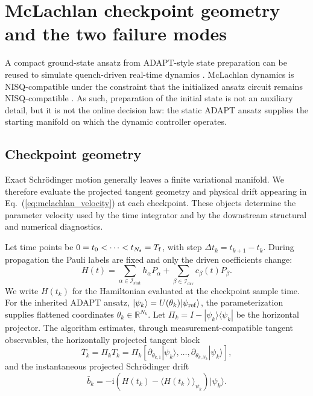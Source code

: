 \documentclass[
  reprint,
  amsmath,
  amssymb,
  aps,
  pra,
  nofootinbib,
  superscriptaddress,
  floatfix
]{revtex4-2}
\newcommand{\placeholder}[1]{\textcolor{red!70!black}{\ifmmode\left[#1\right]\else\textsf{[#1]}\fi}}
\newcommand{\ii}{\mathrm{i}}
\newcommand{\stat}{\mathrm{stat}}
\newcommand{\drv}{\mathrm{drv}}
\newcommand{\ket}[1]{|#1\rangle}
\newcommand{\bra}[1]{\langle #1|}
\newcommand{\expval}[1]{\langle #1\rangle}
\begin{document}
\section{McLachlan checkpoint geometry and the two failure modes}
\label{sec:dynamics_method}


A compact ground-state ansatz from ADAPT-style state preparation can be reused to simulate quench-driven real-time dynamics \cite{Grimsley2019,Tang2021,Yordanov2021}. McLachlan dynamics is NISQ-compatible under the constraint that the initialized ansatz circuit remains NISQ-compatible \cite{McLachlan1964,LiBenjamin2017VQS,Yuan2019VQS}. %
As such, preparation of the initial state is not an auxiliary detail, but it is not the online decision law: the static ADAPT ansatz supplies the starting manifold on which the dynamic controller operates.

\subsection{Checkpoint geometry}
Exact Schr\"odinger motion generally leaves a finite variational manifold.  We therefore evaluate the projected tangent geometry and physical drift appearing in Eq.~(\ref{eq:mclachlan_velocity}) at each checkpoint.  These objects determine the parameter velocity used by the time integrator and by the downstream structural and numerical diagnostics.

Let time points be $0=t_0<\cdots<t_{N_t}=T_{\rm f}$, with step $\Delta t_k=t_{k+1}-t_k$. During propagation the Pauli labels are fixed and only the driven coefficients change:
\begin{equation}
H(t)=\sum_{\alpha\in\mathcal I_{\stat}}h_\alpha P_\alpha
+\sum_{\beta\in\mathcal I_{\drv}}c_\beta(t)P_\beta .
\label{eq:dynamics_sampling}
\end{equation}
We write $H(t_k)$ for the Hamiltonian evaluated at the checkpoint sample time.
For the inherited ADAPT ansatz, $\ket{\psi_k}=U(\theta_k)\ket{\psi_{\rm ref}}$, the parameterization supplies flattened coordinates $\theta_k\in\mathbb R^{N_k}$. Let $\Pi_k=I-\ket{\psi_k}\!\bra{\psi_k}$ be the horizontal projector.  The algorithm estimates, through measurement-compatible tangent observables, the horizontally projected tangent block
\begin{equation}
\bar T_k=\Pi_k T_k
=\Pi_k\left[
\partial_{\theta_{k,1}}\ket{\psi_k},\ldots,
\partial_{\theta_{k,N_k}}\ket{\psi_k}
\right],
\label{eq:projected_tangent_block}
\end{equation}
and the instantaneous projected Schrödinger drift
\begin{equation}
\bar b_k=-\ii\left(H(t_k)-\expval{H(t_k)}_{\psi_k}\right)\ket{\psi_k}.
\label{eq:projected_schrodinger_drift}
\end{equation}
\end{document}
